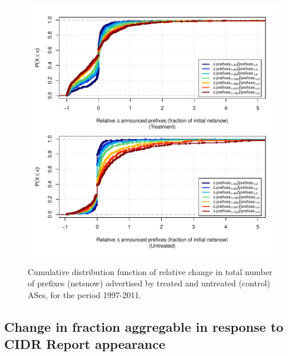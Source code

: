 \begin{figure}[H]
\begin{centering}
\begin{singlespace}
    \includegraphics[width=6in]{figures/behavior-rel_netsnow-1997_2011-corr.pdf}
    \vspace{-2em}\\
    \caption{Cumulative distribution function of relative change in total
    number of prefixes (netsnow) advertised by treated and untreated (control)
    ASes, for the period 1997-2011.}
\end{singlespace}
\end{centering}
\end{figure}

\subsection{Change in fraction aggregable in response to CIDR Report appearance}

